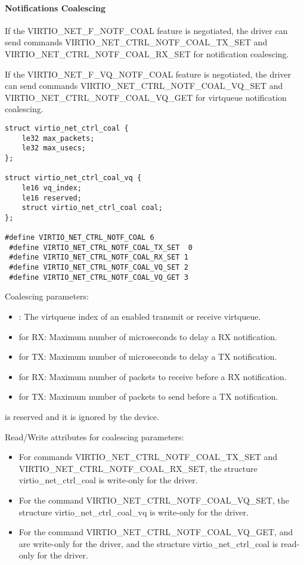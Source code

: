 \paragraph{Notifications Coalescing}\label{sec:Device Types / Network Device / Device Operation / Control Virtqueue / Notifications Coalescing}

If the VIRTIO_NET_F_NOTF_COAL feature is negotiated, the driver can
send commands VIRTIO_NET_CTRL_NOTF_COAL_TX_SET and VIRTIO_NET_CTRL_NOTF_COAL_RX_SET
for notification coalescing.

If the VIRTIO_NET_F_VQ_NOTF_COAL feature is negotiated, the driver can
send commands VIRTIO_NET_CTRL_NOTF_COAL_VQ_SET and VIRTIO_NET_CTRL_NOTF_COAL_VQ_GET
for virtqueue notification coalescing.

\begin{lstlisting}
struct virtio_net_ctrl_coal {
    le32 max_packets;
    le32 max_usecs;
};

struct virtio_net_ctrl_coal_vq {
    le16 vq_index;
    le16 reserved;
    struct virtio_net_ctrl_coal coal;
};

#define VIRTIO_NET_CTRL_NOTF_COAL 6
 #define VIRTIO_NET_CTRL_NOTF_COAL_TX_SET  0
 #define VIRTIO_NET_CTRL_NOTF_COAL_RX_SET 1
 #define VIRTIO_NET_CTRL_NOTF_COAL_VQ_SET 2
 #define VIRTIO_NET_CTRL_NOTF_COAL_VQ_GET 3
\end{lstlisting}

Coalescing parameters:
\begin{itemize}
\item {}: The virtqueue index of an enabled transmit or receive virtqueue.
\item {} for RX: Maximum number of microseconds to delay a RX notification.
\item {} for TX: Maximum number of microseconds to delay a TX notification.
\item {} for RX: Maximum number of packets to receive before a RX notification.
\item {} for TX: Maximum number of packets to send before a TX notification.
\end{itemize}

 is reserved and it is ignored by the device.

Read/Write attributes for coalescing parameters:
\begin{itemize}
\item For commands VIRTIO_NET_CTRL_NOTF_COAL_TX_SET and VIRTIO_NET_CTRL_NOTF_COAL_RX_SET, the structure virtio_net_ctrl_coal is write-only for the driver.
\item For the command VIRTIO_NET_CTRL_NOTF_COAL_VQ_SET, the structure virtio_net_ctrl_coal_vq is write-only for the driver.
\item For the command VIRTIO_NET_CTRL_NOTF_COAL_VQ_GET,  and  are write-only
      for the driver, and the structure virtio_net_ctrl_coal is read-only for the driver.
\end{itemize}

